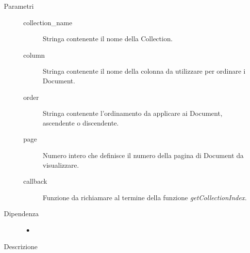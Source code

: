 \begin{description}
\begin{mldescription}
	 \hfill 
		\begin{description}
			\item[Parametri] \hfill
				\begin{description}
					\item[collection\_name] \hfill
					Stringa contenente il nome della Collection.
					\item[column] \hfill
						Stringa contenente il nome della colonna da utilizzare per ordinare i Document.
					\item[order] \hfill
						Stringa contenente l'ordinamento da applicare ai Document, ascendente o discendente.
					\item[page] \hfill
						Numero intero che definisce il numero della pagina di Document da visualizzare.
					\item[callback] \hfill
					Funzione da richiamare al termine della funzione \textit{getCollectionIndex}.
				\end{description}
			\item[Dipendenza] \hfill
				\begin{itemize}
					\item
				\end{itemize}
			\item[Descrizione] \hfill
		\end{description}
	

\end{mldescription}
\end{description}
